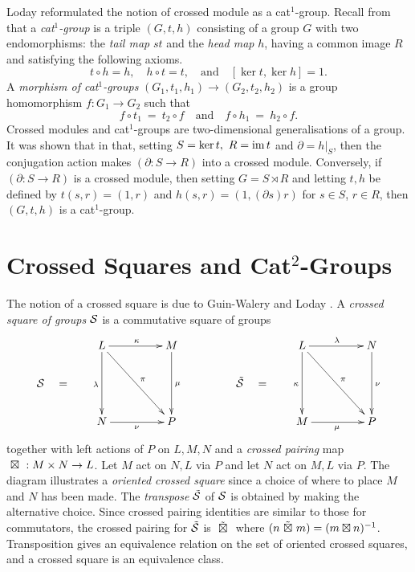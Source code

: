 \documentclass[a4paper,11pt]{article}
\theoremstyle{plain}
\theoremstyle{definition}
\begin{document}
Loday reformulated the notion of crossed module as a cat$^{1}$-group. 
Recall from \cite{Loday} that a \emph{cat$^{1}$-group} is a triple $(G,t,h)$ consisting of a group $G$ with two endomorphisms: 
the \emph{tail map} $st$ and the \emph{head map} $h$, 
having a common image $R$ and satisfying the following axioms. 
$$
t \circ h = h, \quad  h \circ t = t, 
\quad \mbox{and}\quad  [\ker t,\ker h] = 1. 
$$
A \emph{morphism of cat}$^{1}$\emph{-groups} 
$(G_{1},t_1,h_1) \rightarrow (G_{2},t_2,h_2)$ 
is a group homomorphism $f : G_{1} \rightarrow G_{2}$ such that 
$$
f \circ t_1 ~=~ t_2 \circ f  
\quad\mbox{and}\quad 
f \circ h_1 ~=~ h_2 \circ f.
$$
Crossed modules and cat$^{1}$-groups are two-dimensional generalisations 
of a group. 
It was shown that in \cite[Lemma 2.2]{Loday} that, 
setting $S = \ker t,~ R = \mathrm{im}\, t$ and $\partial = h|_{S}$, 
then the conjugation action makes $(\partial : S \rightarrow R)$ 
into a crossed module. 
Conversely, if $(\partial : S \rightarrow R)$ is a crossed module, 
then setting $G = S \rtimes R$ and letting $t,h$ be defined by 
$t(s,r) = (1,r)$ and $h(s,r) = (1,(\partial s)r)$ for $s \in S$, $r \in R$, 
then $(G,t,h)$ is a cat$^{1}$-group.


\section{Crossed Squares and Cat$^{2}$-Groups}

The notion of a crossed square is due to Guin-Walery and Loday \cite{walery}. 
A \emph{crossed square of groups} $\mathcal{S}$ is a commutative square of groups 
\begin{equation} \label{xsq-diag}
\xymatrix@R=20pt@C=20pt
{     &  L \ar[dd]_{\lambda} \ar[rr]^{\kappa} \ar[ddrr]^{\pi} 
         &  & M \ar[dd]^{\mu} 
               &  &  &  L \ar[dd]_{\kappa} \ar[rr]^{\lambda} \ar[ddrr]^{\pi} 
                        &  &  N \ar[dd]^{\nu} \\
\calS \quad = 
      &  &  &  &  &  \tilde{\calS} \quad =  \\  
      &  N \ar[rr]_{\nu} 
         &  & P & &  &  M \ar[rr]_{\mu} 
                        &  &  P } 
\end{equation}
\noindent together with left actions of $P$ on $L,M,N$ 
and a \emph{crossed pairing} map ${\ \boxtimes\ } : M \times N \rightarrow L$. 
Let $M$ act on $N,L$ via $P$ and let $N$ act on $M,L$ via $P$. 
The diagram illustrates a \emph{oriented crossed square} since a choice 
of where to place $M$ and $N$ has been made. 
The \emph{transpose} $\tilde{\mathcal{S}}$ of $\mathcal{S}$ is obtained by making the alternative choice. 
Since crossed pairing identities are similar to those for commutators, 
the crossed pairing for $\tilde{\mathcal{S}}$ is $\ \tilde{\boxtimes}\ $ 
where $(n \ \tilde{\boxtimes}\  m) = (m \boxtimes n)^{-1}$. 
Transposition gives an equivalence relation on the set of 
oriented crossed squares, and a crossed square is an equivalence class. 
\end{document}
